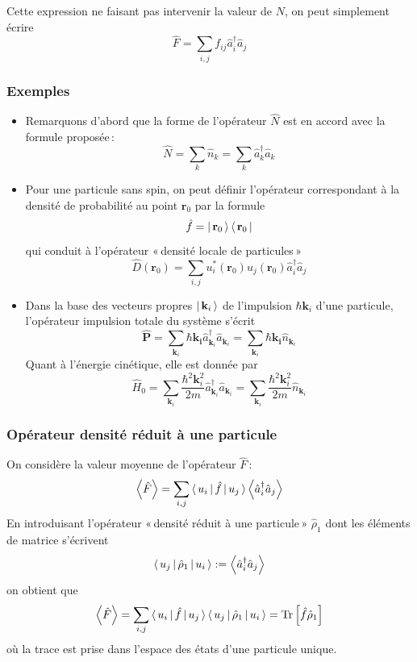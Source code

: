             Cette expression ne faisant pas intervenir la valeur de $N$, on peut simplement écrire 
            \[ \hat{F} = \sum_{i,j} f_{ij} \hat{a}_i^{\dagger} \hat{a}_j \]   

            \subsubsection{Exemples}

            \begin{itemize}
                \item Remarquons d’abord que la forme de l’opérateur $\hat{N}$ est en accord avec la formule proposée :
            \[ \hat{N} = \sum_{k} \hat{n}_k = \sum_{k} \hat{a}_k^{\dagger} \hat{a}_k \]   
                \item Pour une particule sans spin, on peut définir l’opérateur correspondant à la densité de probabilité au point $\mathbf{r}_0$ par la formule 
                \[ \hat{f} = \left| \, \mathbf{r}_0 \, \right> \left< \, \mathbf{r}_0 \, \right| \]   
                qui conduit à l’opérateur « densité locale de particules » 
                \[ \hat{D}(\mathbf{r}_0) = \sum_{i,j} u_i^*(\mathbf{r}_0) u_j (\mathbf{r}_0) \hat{a}_i^{\dagger} \hat{a}_j \]  
                \item Dans la base des vecteurs propres $\left| \, \mathbf{k}_i \, \right>$ de l’impulsion $\hbar \mathbf{k}_i$ d’une particule, l’opérateur impulsion totale du système s’écrit 
                \[ \hat{\mathbf{P}} = \sum_{\mathbf{k}_i} \hbar \mathbf{k_i} \hat{a}_{\mathbf{k}_i}^{\dagger} \hat{a}_{\mathbf{k}_i} = \sum_{\mathbf{k}_i} \hbar \mathbf{k_i} \hat{n}_{\mathbf{k}_i} \]
                Quant à l’énergie cinétique, elle est donnée par 
                \[ \hat{H}_0 = \sum_{\mathbf{k}_i} \frac{\hbar^2 \mathbf{k}_i^2}{2m} \hat{a}_{\mathbf{k}_i}^{\dagger} \hat{a}_{\mathbf{k}_i} = \sum_{\mathbf{k}_i} \frac{\hbar^2 \mathbf{k}_i^2}{2m} \hat{n}_{\mathbf{k}_i} \]
            \end{itemize}
            
            \subsubsection{Opérateur densité réduit à une particule}

            On considère la valeur moyenne de l’opérateur $\hat{F}$ :
            \[ \left<\hat{F}\right> = \sum_{i,j} \left< \, u_i \, \right| \hat{f} \left| \, u_j \, \right> \left<\hat{a}_i^{\dagger} \hat{a}_j\right> \]   
            En introduisant l’opérateur « densité réduit à une particule » $\hat{\rho}_1$ dont les éléments de matrice s’écrivent 
            \[ \left< \, u_j \, \right| \hat{\rho}_1 \left| \, u_i \, \right> := \left<\hat{a}_i^{\dagger} \hat{a}_j\right> \]    
            on obtient que 
            \[ \left<\hat{F}\right> = \sum_{i,j} \left< \, u_i \, \right| \hat{f} \left| \, u_j \, \right> \left< \, u_j \, \right| \hat{\rho}_1 \left| \, u_i \, \right> = \text{Tr}\left[\hat{f} \hat{\rho}_1\right] \]
            où la trace est prise dans l’espace des états d’une particule unique.


